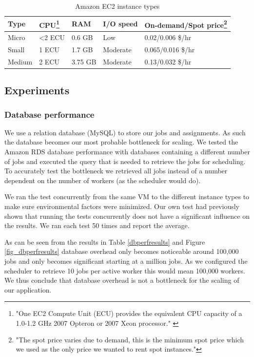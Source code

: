 \documentclass[a4paper]{IEEEtran}
\begin{document}
\begin{savenotes}
\begin{table}
\caption{Amazon EC2 instance types}
\label{amazoninstancespec}
\centering
\begin{tabular}{| l | l | l | l | l |}
\hline
Type & CPU\footnote{"One EC2 Compute Unit (ECU) provides the equivalent CPU capacity of a 1.0-1.2 GHz 2007 Opteron or 2007 Xeon processor." \cite{amazonecu}} & RAM & I/O speed & On-demand/Spot price\footnote{"The spot price varies due to demand, this is the minimum spot price which we used as the only price we wanted to rent spot instances."} \\ \hline
Micro & \textless 2 ECU & 0.6 GB & Low & 0.02/0.006 \$/hr \\ \hline
Small & 1 ECU & 1.7 GB & Moderate & 0.065/0.016 \$/hr \\ \hline
Medium & 2 ECU & 3.75 GB & Moderate & 0.13/0.032 \$/hr \\ \hline
\end{tabular}
\end{table}
\end{savenotes}

\subsection{Experiments}

\subsubsection{Database performance}

We use a relation database (MySQL) to store our jobs and assignments. As such the database becomes our most probable bottleneck for scaling. We tested the Amazon RDS database performance with databases containing a different number of jobs and executed the query that is needed to retrieve the jobs for scheduling. To accurately test the bottleneck we retrieved all jobs instead of a number dependent on the number of workers (as the scheduler would do).

We ran the test concurrently from the same VM to the different instance types to make sure environmental factors were minimized. Our own test had previously shown that running the tests concurrently does not have a significant influence on the results. We ran each test 50 times and report the average.

As can be seen from the results in Table \ref{dbperfresults} and Figure \ref{fig_dbperfresults} database overhead only becomes noticeable around 100,000 jobs and only becomes significant starting at a million jobs. As we configured the scheduler to retrieve 10 jobs per active worker this would mean 100,000 workers. We thus conclude that database overhead is not a bottleneck for the scaling of our application.
\end{document}
